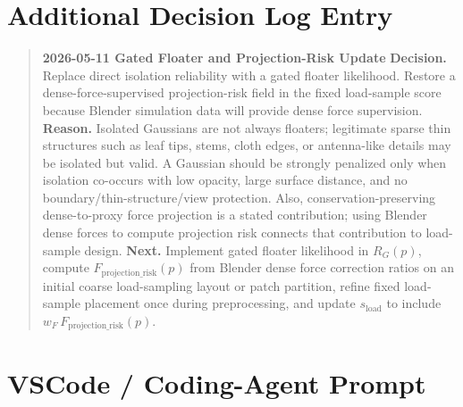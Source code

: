 \documentclass[11pt,a4paper]{article}
\begin{document}
\section{Additional Decision Log Entry}

\begin{quote}
\textbf{2026-05-11 Gated Floater and Projection-Risk Update}\newline
\textbf{Decision.} Replace direct isolation reliability with a gated floater likelihood. Restore a dense-force-supervised projection-risk field in the fixed load-sample score because Blender simulation data will provide dense force supervision.\newline
\textbf{Reason.} Isolated Gaussians are not always floaters; legitimate sparse thin structures such as leaf tips, stems, cloth edges, or antenna-like details may be isolated but valid. A Gaussian should be strongly penalized only when isolation co-occurs with low opacity, large surface distance, and no boundary/thin-structure/view protection. Also, conservation-preserving dense-to-proxy force projection is a stated contribution; using Blender dense forces to compute projection risk connects that contribution to load-sample design.\newline
\textbf{Next.} Implement gated floater likelihood in $R_G(p)$, compute $F_{\mathrm{projection\_risk}}(p)$ from Blender dense force correction ratios on an initial coarse load-sampling layout or patch partition, refine fixed load-sample placement once during preprocessing, and update $s_{\mathrm{load}}$ to include $w_F \, F_{\mathrm{projection\_risk}}(p)$.
\end{quote}

\section{VSCode / Coding-Agent Prompt}
\end{document}
